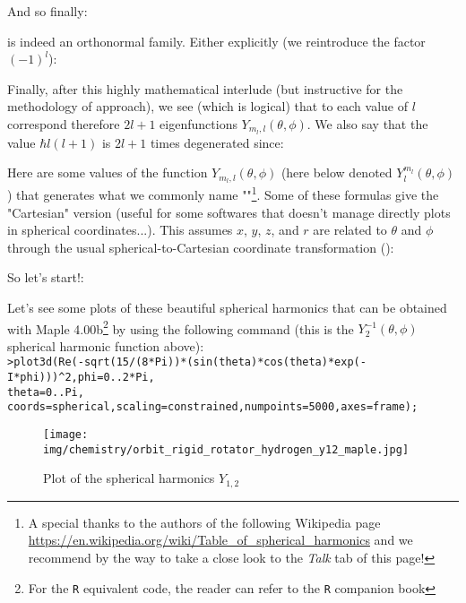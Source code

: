 	And so finally:
	
	is indeed an orthonormal family. Either explicitly (we reintroduce the factor $(-1)^l$):
	
	Finally, after this highly mathematical interlude (but instructive for the methodology of approach), we see (which is logical) that to each value of $l$ correspond therefore $2l + 1$ eigenfunctions $Y_{m_l,l}(\theta,\phi)$. We also say that the value $\hbar l(l+1)$ is $2l + 1$ times degenerated since:
	
	Here are some values of the function  $Y_{m_l,l}(\theta,\phi)$ (here below denoted $Y_{l}^{m_l}(\theta,\phi)$) that generates what we commonly name ""\footnote{A special thanks to the authors of the following Wikipedia page \url{https://en.wikipedia.org/wiki/Table_of_spherical_harmonics} and we recommend by the way to take a close look to the \textit{Talk} tab of this page!}. Some of these formulas give the "Cartesian" version (useful for some softwares that doesn't manage directly plots in spherical coordinates...). This assumes $x$, $y$, $z$, and $r$ are related to $\theta$  and $\phi$ through the usual spherical-to-Cartesian coordinate transformation ():
	
	So let's start!:
	
	
	
	
	
	
	
	
	
	
	
	
	Let's see some plots of these beautiful spherical harmonics that can be obtained with Maple 4.00b\footnote{For the \texttt{R} equivalent code, the reader can refer to the \texttt{R} companion book} by using the following command (this is the $Y_2^{-1}(\theta,\phi)$ spherical harmonic function above):\\

	\texttt{>plot3d(Re(-sqrt(15/(8*Pi))*(sin(theta)*cos(theta)*exp(-I*phi)))\string^2,phi=0..2*Pi,\\theta=0..Pi, coords=spherical,scaling=constrained,numpoints=5000,axes=frame);}
	\begin{figure}[H]
		\centering
		\texttt{[image: img/chemistry/orbit\_rigid\_rotator\_hydrogen\_y12\_maple.jpg]}	
		\caption{Plot of the spherical harmonics $Y_{1,2}$}
	\end{figure}
	
